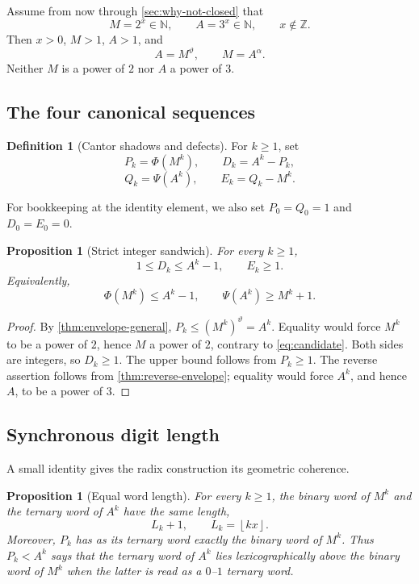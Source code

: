 \documentclass[11pt]{article}
\newtheorem{proposition}[theorem]{Proposition}
\theoremstyle{definition}
\newtheorem{definition}[theorem]{Definition}
\theoremstyle{remark}
\newcommand{\N}{\mathbb N}
\newcommand{\Z}{\mathbb Z}
\newcommand{\floor}[1]{\left\lfloor #1\right\rfloor}
\newcommand{\PhiMap}{\Phi}
\newcommand{\PsiMap}{\Psi}
\newcommand{\thetaAE}{\vartheta}
\newcommand{\alphaAE}{\alpha}
\begin{document}
Assume from now through \cref{sec:why-not-closed} that
\begin{equation}\label{eq:candidate}
  M=2^x\in\N,
  \qquad A=3^x\in\N,
  \qquad x\notin\Z.
\end{equation}
Then $x>0$, $M>1$, $A>1$, and
\[
  A=M^{\thetaAE},\qquad M=A^{\alphaAE}.
\]
Neither $M$ is a power of $2$ nor $A$ a power of $3$.

\subsection{The four canonical sequences}

\begin{definition}[Cantor shadows and defects]\label{def:defects}
For $k\ge1$, set
\[
 P_k=\PhiMap(M^k),\qquad D_k=A^k-P_k,
\]
\[
 Q_k=\PsiMap(A^k),\qquad E_k=Q_k-M^k.
\]
\end{definition}

For bookkeeping at the identity element, we also set $P_0=Q_0=1$ and $D_0=E_0=0$.

\begin{proposition}[Strict integer sandwich]\label{prop:strict-sandwich}
For every $k\ge1$,
\[
  1\le D_k\le A^k-1,
  \qquad
  E_k\ge1.
\]
Equivalently,
\[
  \PhiMap(M^k)\le A^k-1,
  \qquad
  \PsiMap(A^k)\ge M^k+1.
\]
\end{proposition}

\begin{proof}
By \cref{thm:envelope-general},
$P_k\le(M^k)^{\thetaAE}=A^k$.  Equality would force $M^k$ to be a power of
$2$, hence $M$ a power of $2$, contrary to \eqref{eq:candidate}.  Both sides
are integers, so $D_k\ge1$.  The upper bound follows from $P_k\ge1$.
The reverse assertion follows from \cref{thm:reverse-envelope}; equality
would force $A^k$, and hence $A$, to be a power of $3$.
\end{proof}

\subsection{Synchronous digit length}

A small identity gives the radix construction its geometric coherence.

\begin{proposition}[Equal word length]\label{prop:same-length}
For every $k\ge1$, the binary word of $M^k$ and the ternary word of $A^k$
have the same length,
\[
  L_k+1,\qquad L_k=\floor{kx}.
\]
Moreover, $P_k$ has as its ternary word exactly the binary word of $M^k$.
Thus $P_k<A^k$ says that the ternary word of $A^k$ lies lexicographically
above the binary word of $M^k$ when the latter is read as a $0$--$1$ ternary
word.
\end{proposition}
\end{document}
